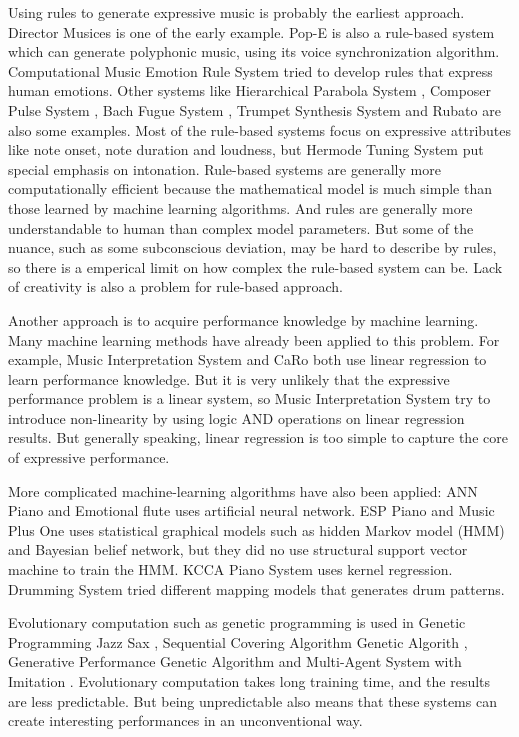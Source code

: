 Using rules to generate expressive music is probably the earliest approach. Director Musices \cite{17} is one of the early example.  Pop-E \cite{28} is also a rule-based system which can generate polyphonic music, using its voice synchronization algorithm. Computational Music Emotion Rule System \cite{31} tried to develop rules that express human emotions. Other systems like Hierarchical Parabola System \cite{17,18,19,20}, Composer Pulse System \cite{21,22}, Bach Fugue System \cite{23}, Trumpet Synthesis System \cite{24, 25} and Rubato \cite{26, 27} are also some examples. Most of the rule-based systems focus on expressive attributes like note onset, note duration and loudness, but Hermode Tuning System \cite{29} put special emphasis on intonation. Rule-based systems are generally more computationally efficient because the mathematical model is much simple than those learned by machine learning algorithms. And rules are generally more understandable to human than complex model parameters. But some of the nuance, such as some subconscious deviation, may be hard to describe by rules, so there is a emperical limit on how complex the rule-based system can be. Lack of creativity is also a problem for rule-based approach.

Another approach is to acquire performance knowledge by machine learning. Many machine learning methods have already been applied to this problem. For example, Music Interpretation System \cite{32,33,34} and CaRo \cite{35,36,37} both use linear regression to learn performance knowledge. But it is very unlikely that the expressive performance problem is a linear system, so Music Interpretation System try to introduce non-linearity by using logic AND operations on linear regression results. But generally speaking, linear regression is too simple to capture the core of expressive performance.

More complicated machine-learning algorithms have also been applied: ANN Piano \cite{38} and Emotional flute \cite{39} uses artificial neural network. ESP Piano \cite{55} and Music Plus One \cite{52,53,54} uses statistical graphical models such as hidden Markov model (HMM) and Bayesian belief network, but they did no use structural support vector machine to train the HMM. KCCA Piano System \cite{57} uses kernel regression. Drumming System \cite{82} tried different mapping models that generates drum patterns.

Evolutionary computation such as genetic programming is used in Genetic Programming Jazz Sax \cite{88}, Sequential Covering Algorithm Genetic Algorith \cite{59}, Generative Performance Genetic Algorithm \cite{89} and Multi-Agent System with Imitation \cite{60, 93}. Evolutionary computation takes long training time, and the results are less predictable. But being unpredictable also means that these systems can create interesting performances in an unconventional way.

